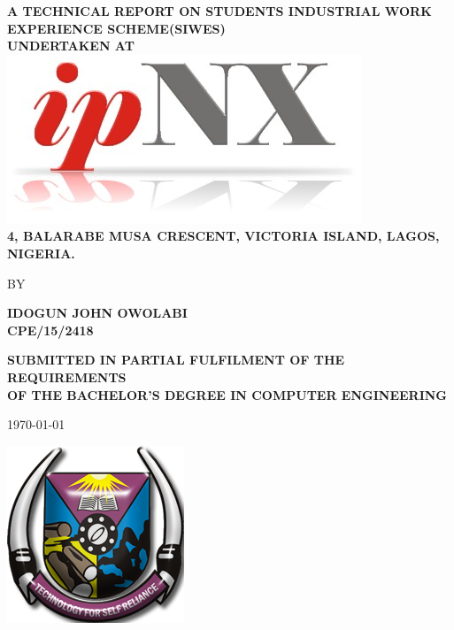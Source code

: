 \begin{titlepage}


\begin{center}
{\bf A TECHNICAL REPORT ON STUDENTS INDUSTRIAL WORK EXPERIENCE SCHEME(SIWES)\\ \vspace{.5em}UNDERTAKEN AT\\}
\includegraphics[scale=6]{./ipnx}
{\bf \\4, BALARABE MUSA CRESCENT, VICTORIA ISLAND, LAGOS, NIGERIA.}

\end{center}

\vfill

\begin{center}
BY
\end{center}

\vfill
\begin{center}
{\large \bf IDOGUN JOHN OWOLABI\\ CPE/15/2418}\\
\end{center}


\vfill


\begin{center}
{\bf \uppercase{Submitted in partial fulfilment of the requirements \\of the Bachelor's degree in Computer Engineering}}
\end{center}

\vfill
\begin{center}
{\today}
\end{center}

\vfill
	
\begin{center}
\includegraphics[scale=4]{./futa}
\end{center}


\end{titlepage}
